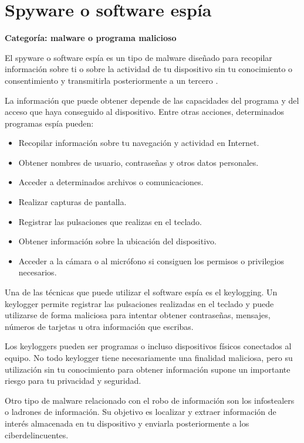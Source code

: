 \documentclass[
  spanish,
  a4paper,
  openany]{book}
\begin{document}
\section{Spyware o software espía}\label{spyware-o-software-espuxeda}

\textbf{Categoría: malware o programa malicioso}

El spyware o software espía es un tipo de malware diseñado para recopilar información sobre ti o sobre la actividad de tu dispositivo sin tu conocimiento o consentimiento y transmitirla posteriormente a un tercero \citep{AVAST-spyware}.

La información que puede obtener depende de las capacidades del programa y del acceso que haya conseguido al dispositivo. Entre otras acciones, determinados programas espía pueden:

\begin{itemize}
\item
  Recopilar información sobre tu navegación y actividad en Internet.
\item
  Obtener nombres de usuario, contraseñas y otros datos personales.
\item
  Acceder a determinados archivos o comunicaciones.
\item
  Realizar capturas de pantalla.
\item
  Registrar las pulsaciones que realizas en el teclado.
\item
  Obtener información sobre la ubicación del dispositivo.
\item
  Acceder a la cámara o al micrófono si consiguen los permisos o privilegios necesarios.
\end{itemize}

Una de las técnicas que puede utilizar el software espía es el keylogging. Un keylogger permite registrar las pulsaciones realizadas en el teclado y puede utilizarse de forma maliciosa para intentar obtener contraseñas, mensajes, números de tarjetas u otra información que escribas.

Los keyloggers pueden ser programas o incluso dispositivos físicos conectados al equipo. No todo keylogger tiene necesariamente una finalidad maliciosa, pero su utilización sin tu conocimiento para obtener información supone un importante riesgo para tu privacidad y seguridad.

Otro tipo de malware relacionado con el robo de información son los infostealers o ladrones de información. Su objetivo es localizar y extraer información de interés almacenada en tu dispositivo y enviarla posteriormente a los ciberdelincuentes.
\end{document}
